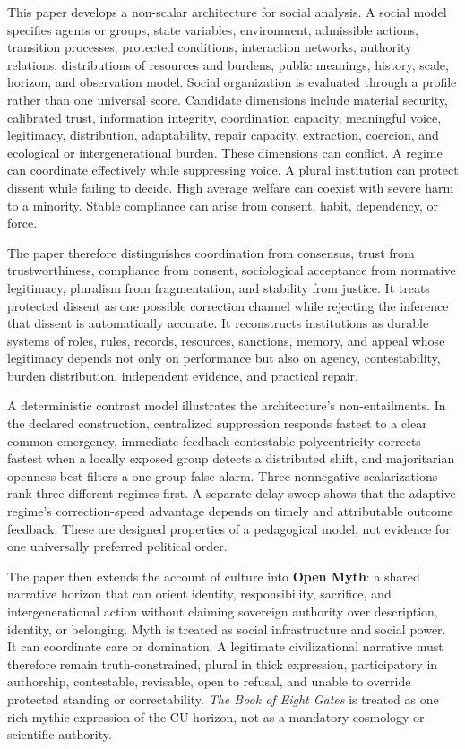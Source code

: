 \documentclass[
  11pt,
]{article}
\begin{document}
This paper develops a non-scalar architecture for social analysis. A
social model specifies agents or groups, state variables, environment,
admissible actions, transition processes, protected conditions,
interaction networks, authority relations, distributions of resources
and burdens, public meanings, history, scale, horizon, and observation
model. Social organization is evaluated through a profile rather than
one universal score. Candidate dimensions include material security,
calibrated trust, information integrity, coordination capacity,
meaningful voice, legitimacy, distribution, adaptability, repair
capacity, extraction, coercion, and ecological or intergenerational
burden. These dimensions can conflict. A regime can coordinate
effectively while suppressing voice. A plural institution can protect
dissent while failing to decide. High average welfare can coexist with
severe harm to a minority. Stable compliance can arise from consent,
habit, dependency, or force.

The paper therefore distinguishes coordination from consensus, trust
from trustworthiness, compliance from consent, sociological acceptance
from normative legitimacy, pluralism from fragmentation, and stability
from justice. It treats protected dissent as one possible correction
channel while rejecting the inference that dissent is automatically
accurate. It reconstructs institutions as durable systems of roles,
rules, records, resources, sanctions, memory, and appeal whose
legitimacy depends not only on performance but also on agency,
contestability, burden distribution, independent evidence, and practical
repair.

A deterministic contrast model illustrates the architecture's
non-entailments. In the declared construction, centralized suppression
responds fastest to a clear common emergency, immediate-feedback
contestable polycentricity corrects fastest when a locally exposed group
detects a distributed shift, and majoritarian openness best filters a
one-group false alarm. Three nonnegative scalarizations rank three
different regimes first. A separate delay sweep shows that the adaptive
regime's correction-speed advantage depends on timely and attributable
outcome feedback. These are designed properties of a pedagogical model,
not evidence for one universally preferred political order.

The paper then extends the account of culture into \textbf{Open Myth}: a
shared narrative horizon that can orient identity, responsibility,
sacrifice, and intergenerational action without claiming sovereign
authority over description, identity, or belonging. Myth is treated as
social infrastructure and social power. It can coordinate care or
domination. A legitimate civilizational narrative must therefore remain
truth-constrained, plural in thick expression, participatory in
authorship, contestable, revisable, open to refusal, and unable to
override protected standing or correctability. \emph{The Book of Eight
Gates} is treated as one rich mythic expression of the CU horizon, not
as a mandatory cosmology or scientific authority.
\end{document}
